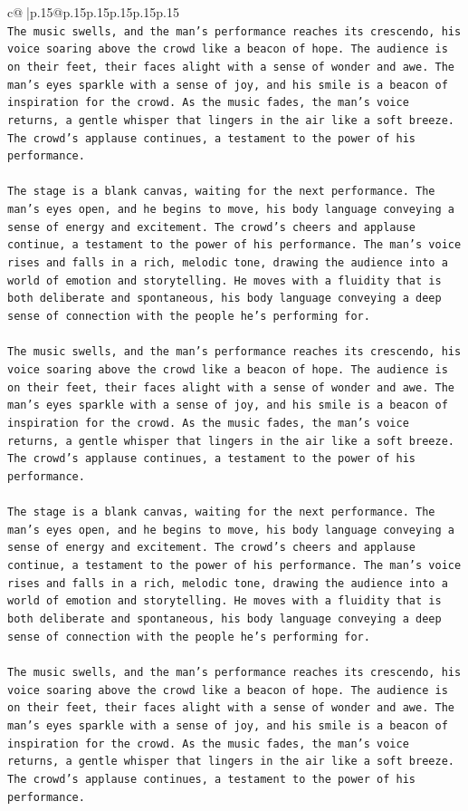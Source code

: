 \documentclass{article}
\begin{document}
{\begin{supertabular}{c@{$\;$}|p{.15\linewidth}@{}p{.15\linewidth}p{.15\linewidth}p{.15\linewidth}p{.15\linewidth}p{.15\linewidth}}
{{{\\ 
\texttt{The music swells, and the man's performance reaches its crescendo, his voice soaring above the crowd like a beacon of hope. The audience is on their feet, their faces alight with a sense of wonder and awe. The man's eyes sparkle with a sense of joy, and his smile is a beacon of inspiration for the crowd. As the music fades, the man's voice returns, a gentle whisper that lingers in the air like a soft breeze. The crowd's applause continues, a testament to the power of his performance.} \\
\\ 
\texttt{The stage is a blank canvas, waiting for the next performance. The man's eyes open, and he begins to move, his body language conveying a sense of energy and excitement. The crowd's cheers and applause continue, a testament to the power of his performance. The man's voice rises and falls in a rich, melodic tone, drawing the audience into a world of emotion and storytelling. He moves with a fluidity that is both deliberate and spontaneous, his body language conveying a deep sense of connection with the people he's performing for.} \\
\\ 
\texttt{The music swells, and the man's performance reaches its crescendo, his voice soaring above the crowd like a beacon of hope. The audience is on their feet, their faces alight with a sense of wonder and awe. The man's eyes sparkle with a sense of joy, and his smile is a beacon of inspiration for the crowd. As the music fades, the man's voice returns, a gentle whisper that lingers in the air like a soft breeze. The crowd's applause continues, a testament to the power of his performance.} \\
\\ 
\texttt{The stage is a blank canvas, waiting for the next performance. The man's eyes open, and he begins to move, his body language conveying a sense of energy and excitement. The crowd's cheers and applause continue, a testament to the power of his performance. The man's voice rises and falls in a rich, melodic tone, drawing the audience into a world of emotion and storytelling. He moves with a fluidity that is both deliberate and spontaneous, his body language conveying a deep sense of connection with the people he's performing for.} \\
\\ 
\texttt{The music swells, and the man's performance reaches its crescendo, his voice soaring above the crowd like a beacon of hope. The audience is on their feet, their faces alight with a sense of wonder and awe. The man's eyes sparkle with a sense of joy, and his smile is a beacon of inspiration for the crowd. As the music fades, the man's voice returns, a gentle whisper that lingers in the air like a soft breeze. The crowd's applause continues, a testament to the power of his performance.} \\
}}}
\end{supertabular}}
\end{document}
